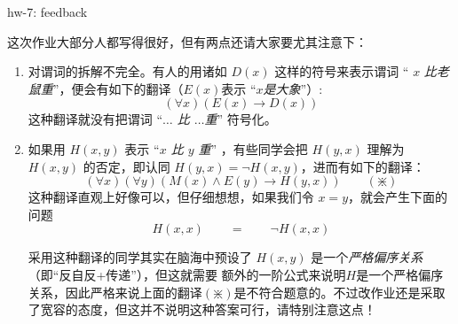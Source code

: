 \documentclass[UTF8,12pt,a4paper]{ctexart}
\begin{document}
\dotfill hw-7: feedback
\dotfill

这次作业大部分人都写得很好，但有两点还请大家要尤其注意下：

\begin{enumerate}
	\item 对谓词的拆解不完全。有人的用诸如 $D(x)$ 这样的符号来表示谓词\; “ $x$ \textit{比老鼠重}”，便会有如下的翻译（$E(x)$表示\; “$x$\textit{是大象}”）:
	\[
	(\forall x) (E(x) \to D(x))
	\]
	这种翻译就没有把谓词\; “\textit{$\dots$ 比  $\dots$重}” \;符号化。
	
	\item 如果用 $H(x,y)$ 表示 \; “\textit{$x$ 比  $y$ 重}” ，有些同学会把 $H(y,x)$ 理解为 $H(x,y)$ 的否定，即认同 $H(y,x) = \neg H (x,y)$，进而有如下的翻译：
	\[
	(\forall x) (\forall y) (M(x) \land E(y) \to  H(y,x))  \qquad (\divideontimes)
	\]
	这种翻译直观上好像可以，但仔细想想，如果我们令 $x =y$，就会产生下面的问题
	\[
	H(x,x) \qquad = \qquad \neg H(x,x)
	\]
	
	采用这种翻译的同学其实在脑海中预设了 $H(x,y)$ 是一个\textit{严格偏序关系}（即“反自反+传递”），但这就需要{\color{purple} 额外的}一阶公式来说明$H$是一个严格偏序关系，因此严格来说上面的翻译$(\divideontimes)$是不符合题意的。不过改作业还是采取了宽容的态度，但这并不说明这种答案可行，请特别注意这点！
\end{enumerate}
\end{document}
